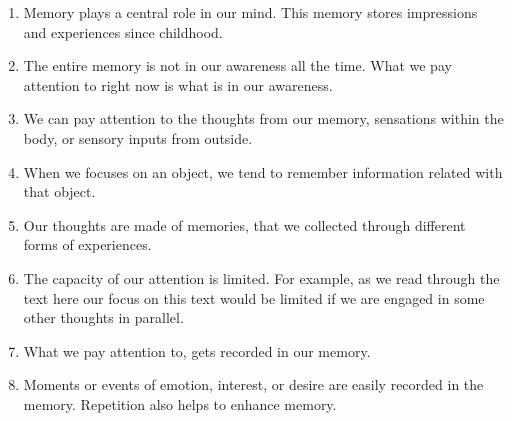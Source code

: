 \documentclass[reprint,amsmath,amssymb,apr,aip,onecolumn, 11pt]{revtex4-1}
\begin{document}
	\begin{enumerate}
		\item Memory plays a central role in our mind. This memory stores impressions and experiences since childhood. 
		
		\item	The entire memory is not in our awareness all the time. What we pay attention to right now is what is in our awareness. 
		
		\item	We can pay attention to the thoughts from our memory,  sensations within the body, or sensory inputs from outside.
		
		\item When we  focuses on an object, we tend to remember information related with that object.  
		
		\item	Our thoughts are made of memories, that we collected through different forms of experiences. 
		
		\item	The capacity of our attention is limited. For example, as we read through the text here our focus on this text would be limited if we are engaged in some other thoughts in parallel. 
		
		\item	What we pay attention to, gets recorded in our memory.  
		
		\item	Moments or events of emotion, interest, or desire are easily recorded in the memory. Repetition also helps to enhance memory.
	 	
	 	
	 	
	 \end{enumerate}
	
\end{document}
